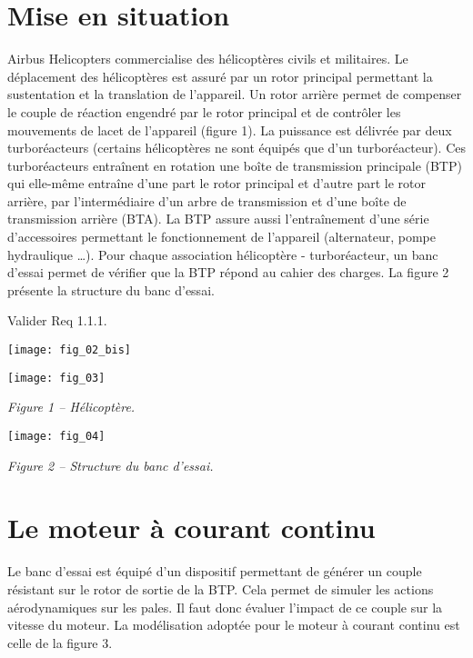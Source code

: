 \ifprof
\else
\begin{multicols}{2}
\fi



\section*{Mise en situation}
\ifprof
\else
Airbus Helicopters commercialise des hélicoptères civils et militaires. Le déplacement des hélicoptères est assuré par un rotor principal permettant la sustentation et la translation de l'appareil. Un rotor arrière permet de compenser le couple de réaction engendré par le rotor principal et de contrôler les mouvements de lacet de l'appareil (figure 1).
La puissance est délivrée par deux turboréacteurs (certains hélicoptères ne sont équipés que d'un turboréacteur). Ces turboréacteurs entraînent en rotation une boîte de transmission principale (BTP) qui elle-même entraîne d'une part le rotor principal et d'autre part le rotor arrière, par l'intermédiaire d'un arbre de transmission et d'une boîte de transmission arrière (BTA). La BTP assure aussi l'entraînement d'une série d'accessoires permettant le fonctionnement de l'appareil (alternateur, pompe hydraulique …).
Pour chaque association hélicoptère - turboréacteur, un banc d'essai permet de vérifier que la BTP répond au cahier des charges. La figure 2 présente la structure du banc d'essai.

\fi

\begin{obj}
	Valider Req 1.1.1.
\end{obj}

\ifprof
\else

\begin{center}
\texttt{[image: fig\_02\_bis]}

\end{center}

\begin{center}
\texttt{[image: fig\_03]}

\textit{Figure 1 -- Hélicoptère.}
\end{center}


\begin{center}
\texttt{[image: fig\_04]}

\textit{Figure 2 -- Structure du banc d'essai.}
\end{center}
\fi

\section*{Le moteur à courant continu}
\ifprof
\else
Le banc d'essai est équipé d'un dispositif permettant de générer un couple résistant sur le rotor de sortie de la BTP. Cela permet de simuler les actions aérodynamiques sur les pales. Il faut donc évaluer l'impact de ce couple sur la vitesse du moteur. 
La modélisation adoptée pour le moteur à courant continu est celle de la figure 3.
 

\end{multicols}
